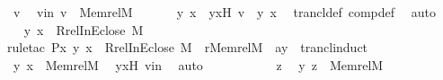 \begin{isabellebody}
\ v\ \isamarkupfalse%
\ vin{\isacharcolon}{\kern0pt}\ {\isachardoublequoteopen}v\ {\isasymin}\ Memrel{\isacharparenleft}{\kern0pt}M{\isacharparenright}{\kern0pt}{\isacharcircum}{\kern0pt}{\isacharplus}{\kern0pt}{\isachardoublequoteclose}\ \isanewline
\ \ \isamarkupfalse%
\ \isamarkupfalse%
\ y\ x\ \ yxH{\isacharcolon}{\kern0pt}\ {\isachardoublequoteopen}v\ {\isacharequal}{\kern0pt}\ {\isacharless}{\kern0pt}y{\isacharcomma}{\kern0pt}\ x{\isachargreater}{\kern0pt}{\isachardoublequoteclose}\ \isamarkupfalse%
\ trancl{\isacharunderscore}{\kern0pt}def\ comp{\isacharunderscore}{\kern0pt}def\ \isamarkupfalse%
\ auto\ \isanewline
\ \ \isamarkupfalse%
\ \isamarkupfalse%
\ {\isachardoublequoteopen}{\isacharless}{\kern0pt}y{\isacharcomma}{\kern0pt}\ x{\isachargreater}{\kern0pt}\ {\isasymin}\ Rrel{\isacharparenleft}{\kern0pt}InEclose{\isacharcomma}{\kern0pt}\ M{\isacharparenright}{\kern0pt}{\isachardoublequoteclose}\ \isanewline
\ \ \isamarkupfalse%
{\isacharparenleft}{\kern0pt}rule{\isacharunderscore}{\kern0pt}tac\ P{\isacharequal}{\kern0pt}{\isachardoublequoteopen}{\isasymlambda}x{\isachardot}{\kern0pt}\ {\isacharless}{\kern0pt}y{\isacharcomma}{\kern0pt}\ x{\isachargreater}{\kern0pt}\ {\isasymin}\ Rrel{\isacharparenleft}{\kern0pt}InEclose{\isacharcomma}{\kern0pt}\ M{\isacharparenright}{\kern0pt}{\isachardoublequoteclose}\ \ r{\isacharequal}{\kern0pt}{\isachardoublequoteopen}Memrel{\isacharparenleft}{\kern0pt}M{\isacharparenright}{\kern0pt}{\isachardoublequoteclose}\ \ a{\isacharequal}{\kern0pt}y\ \ trancl{\isacharunderscore}{\kern0pt}induct{\isacharparenright}{\kern0pt}\isanewline
\ \ \ \ \isamarkupfalse%
\ {\isachardoublequoteopen}{\isacharless}{\kern0pt}y{\isacharcomma}{\kern0pt}\ x{\isachargreater}{\kern0pt}\ {\isasymin}\ Memrel{\isacharparenleft}{\kern0pt}M{\isacharparenright}{\kern0pt}{\isacharcircum}{\kern0pt}{\isacharplus}{\kern0pt}{\isachardoublequoteclose}\ \isamarkupfalse%
\ yxH\ vin\ \isamarkupfalse%
\ auto\ \isanewline
\ \ \isamarkupfalse%
\ \isanewline
\ \ \ \ \isamarkupfalse%
\ z\ \isamarkupfalse%
\ {\isachardoublequoteopen}{\isacharless}{\kern0pt}y{\isacharcomma}{\kern0pt}\ z{\isachargreater}{\kern0pt}\ {\isasymin}\ Memrel{\isacharparenleft}{\kern0pt}M{\isacharparenright}{\kern0pt}{\isachardoublequoteclose}\isanewline
\ \ \ \ \isamarkupfalse%

\end{isabellebody}
